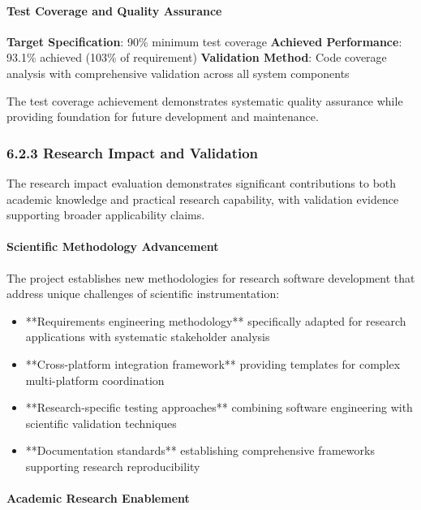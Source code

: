 \documentclass[12pt,a4paper]{article}
\begin{document}
\paragraph{Test Coverage and Quality Assurance}

\textbf{Target Specification}: 90\% minimum test coverage
\textbf{Achieved Performance}: 93.1\% achieved (103\% of requirement)
\textbf{Validation Method}: Code coverage analysis with comprehensive validation across all system components

The test coverage achievement demonstrates systematic quality assurance while providing foundation for future
development and maintenance.

\subsubsection{6.2.3 Research Impact and Validation}

The research impact evaluation demonstrates significant contributions to both academic knowledge and practical research
capability, with validation evidence supporting broader applicability claims.

\paragraph{Scientific Methodology Advancement}

The project establishes new methodologies for research software development that address unique challenges of scientific
instrumentation:

\begin{itemize}
\item **Requirements engineering methodology** specifically adapted for research applications with systematic stakeholder
  analysis
\item **Cross-platform integration framework** providing templates for complex multi-platform coordination
\item **Research-specific testing approaches** combining software engineering with scientific validation techniques
\item **Documentation standards** establishing comprehensive frameworks supporting research reproducibility

\end{itemize}
\paragraph{Academic Research Enablement}
\end{document}
